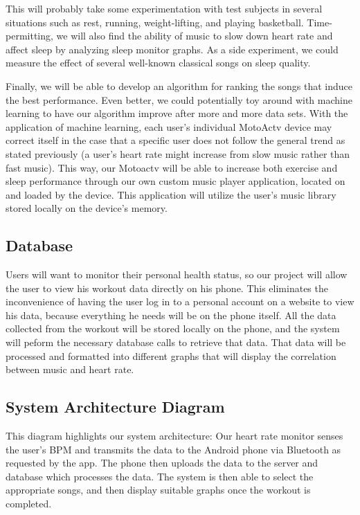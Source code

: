 \documentclass[letterpaper,english, 12pt]{scrreprt}
\begin{document}
This will probably take some experimentation with test subjects in several situations such as rest, running, weight-lifting, and playing basketball. Time-permitting, we will also find the ability of music to slow down heart rate and affect sleep by analyzing sleep monitor graphs. As a side experiment, we could measure the effect of several well-known classical songs on sleep quality.
			 
Finally, we will be able to develop an algorithm for ranking the songs that induce the best performance. Even better, we could potentially toy around with machine learning to have our algorithm improve after more and more data sets. With the application of machine learning, each user's individual MotoActv device may correct itself in the case that a specific user does not follow the general trend as stated previously (a user's heart rate might increase from slow music rather than fast music). This way, our Motoactv will be able to increase both exercise and sleep performance through our own custom music player application, located on and loaded by the device. This application will utilize the user's music library stored locally on the device's memory.

\subsection{Database}
Users will want to monitor their personal health status, so our project will allow the user to view his workout data directly on his phone. This eliminates the inconvenience of having the user log in to a personal account on a website to view his data, because everything he needs will be on the phone itself. All the data collected from the workout will be stored locally on the phone, and the system will peform the necessary database calls to retrieve that data. That data will be processed and formatted into different graphs that will display the correlation between music and heart rate.


\subsection{System Architecture Diagram}
This diagram highlights our system architecture: Our heart rate monitor senses the
user's BPM and transmits the data to the Android phone via Bluetooth as requested
by the app. The phone then uploads the data to the server and database
which processes the data. The system is then able to select the appropriate
songs, and then display suitable graphs once the workout is completed.
\end{document}
